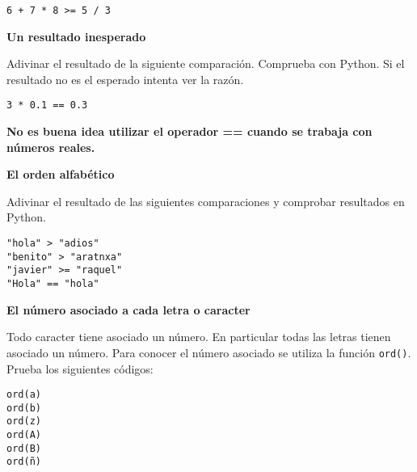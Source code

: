 \documentclass[a4paper, 11pt]{scrartcl}
\newenvironment{code}{\begin{tcolorbox}[colback=red!2!white]}{\end{tcolorbox}}
\begin{document}
\smallskip

\begin{code}

\begin{verbatim}
6 + 7 * 8 >= 5 / 3
\end{verbatim}

\end{code}






\noindent\textbf{\sffamily Un resultado inesperado}

Adivinar el resultado de la siguiente comparación. Comprueba con Python. Si el resultado no es el esperado intenta ver la razón.


\smallskip

\begin{code}

\begin{verbatim}
3 * 0.1 == 0.3
\end{verbatim}

\end{code}

\textbf{No es buena idea utilizar el operador == cuando se trabaja con números reales.}






\noindent\textbf{\sffamily El orden alfabético}

Adivinar el resultado de las siguientes comparaciones y comprobar resultados en Python.

\smallskip

\begin{code}

\begin{verbatim}
"hola" > "adios"
"benito" > "aratnxa"
"javier" >= "raquel"
"Hola" == "hola"
\end{verbatim}

\end{code}






\noindent\textbf{\sffamily \dag{} El número asociado a cada letra o caracter}

 Todo caracter tiene asociado un número. En particular todas las letras tienen asociado un número. Para conocer el número asociado se utiliza la función \verb|ord()|. Prueba los siguientes códigos:

\smallskip

\begin{code}

\begin{verbatim}
ord(a)
ord(b)
ord(z)
ord(A)
ord(B)
ord(ñ)
\end{verbatim}

\end{code}
\end{document}
